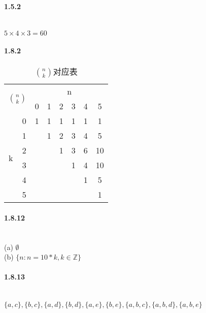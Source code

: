 \documentclass[a4paper, UTF8]{ctexart}				%
\numberwithin{equation}{section}				%
\begin{document}
    \paragraph{1.5.2}\quad \\
        $5 \times 4 \times 3 = 60$
    \paragraph{1.8.2}\quad 
        \begin{table}[h]
        \centering
        \caption{$n \choose k$对应表}
        \label{my-label}
        \begin{tabular}{|c|c|c|c|c|c|c|c|}
        \hline
        \multicolumn{2}{|c|}{\multirow{2}{*}{$n \choose k$}} & \multicolumn{6}{c|}{n} \\ \cline{3-8} 
        \multicolumn{2}{|c|}{}                               & 0 & 1 & 2 & 3 & 4 & 5  \\ \hline
        \multirow{6}{*}{k}                & 0                & 1 & 1 & 1 & 1 & 1 & 1  \\ \cline{2-8} 
                                        & 1                &   & 1 & 2 & 3 & 4 & 5  \\ \cline{2-8} 
                                        & 2                &   &   & 1 & 3 & 6 & 10 \\ \cline{2-8} 
                                        & 3                &   &   &   & 1 & 4 & 10 \\ \cline{2-8} 
                                        & 4                &   &   &   &   & 1 & 5  \\ \cline{2-8} 
                                        & 5                &   &   &   &   &   & 1  \\ \hline
        \end{tabular}
        \end{table}
    \paragraph{1.8.12}\quad \\
        (a) $\emptyset$\\
        (b) $\{n: n = 10 * k, k \in \mathbb{Z}\}$
    \paragraph{1.8.13}\quad\\
        $\{a,c\}, \{b,c\}, \{a, d\}, \{b, d\}, \{a, e\}, \{b, e\}, \{a, b, c\}, \{a, b, d\}, \{a, b, e\}$
\end{document}
